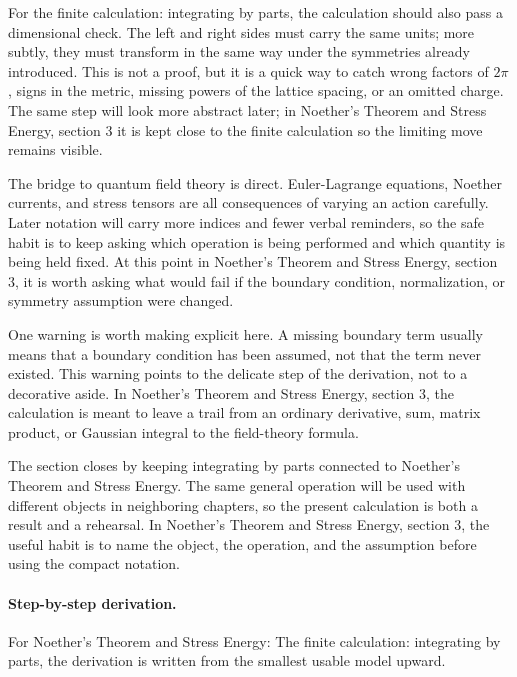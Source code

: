 For the finite calculation: integrating by parts, the calculation should also pass a dimensional check.  The left and right sides must carry the same units; more subtly, they must transform in the same way under the symmetries already introduced.  This is not a proof, but it is a quick way to catch wrong factors of \(2\pi\), signs in the metric, missing powers of the lattice spacing, or an omitted charge.  The same step will look more abstract later; in Noether's Theorem and Stress Energy, section 3 it is kept close to the finite calculation so the limiting move remains visible.

The bridge to quantum field theory is direct.  Euler-Lagrange equations, Noether currents, and stress tensors are all consequences of varying an action carefully.  Later notation will carry more indices and fewer verbal reminders, so the safe habit is to keep asking which operation is being performed and which quantity is being held fixed.  At this point in Noether's Theorem and Stress Energy, section 3, it is worth asking what would fail if the boundary condition, normalization, or symmetry assumption were changed.

One warning is worth making explicit here.  A missing boundary term usually means that a boundary condition has been assumed, not that the term never existed.  This warning points to the delicate step of the derivation, not to a decorative aside.  In Noether's Theorem and Stress Energy, section 3, the calculation is meant to leave a trail from an ordinary derivative, sum, matrix product, or Gaussian integral to the field-theory formula.

The section closes by keeping integrating by parts connected to Noether's Theorem and Stress Energy.  The same general operation will be used with different objects in neighboring chapters, so the present calculation is both a result and a rehearsal.  In Noether's Theorem and Stress Energy, section 3, the useful habit is to name the object, the operation, and the assumption before using the compact notation.



\paragraph{Step-by-step derivation.}

For Noether's Theorem and Stress Energy: The finite calculation: integrating by parts, the derivation is written from the smallest usable model upward.

